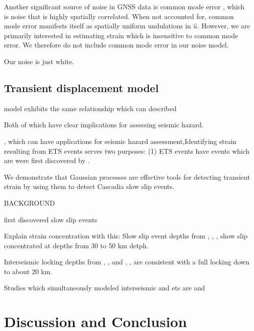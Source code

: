 \documentclass[10pt,a4paper]{article}
\begin{document}
Another significant source of noise in GNSS data is common mode error \citep[e.g.,][]{Wdowinski1997}, which is noise that is highly spatially correlated. When not accounted for, common mode error manifests itself as spatially uniform undulations in $\hat{u}$. However, we are primarily interested in estimating strain which is insensitive to common mode error. We therefore do not include common mode error in our noise model. 

Our noise is just white.           

\subsection{Transient displacement model}

model exhibits the same relationship  which can described  


Both of which have clear implications for assessing seismic hazard.

, which can have applications for seismic hazard assessment,Identifying strain resulting from ETS events serves two purposes: (1) ETS events have  events which are  were first discovered by \citet{Dragert2001}.   


We demonstrate that Gaussian processes are effective tools for detecting transient strain by using them to detect Cascadia slow slip events.  

BACKGROUND

\citet{Dragert2001} first discovered slow slip events

Explain strain concentration with this:
Slow slip event depths from \citet{Dragert2001}, \citet{Wech2009}, \citet{Schmidt2010}, \citet{Bartlow2011} show slip concentrated at depths from 30 to 50 km detph.
 
Interseismic locking depths from \citet{Fluck1997}, \citet{Murray2000}, \citet{McCaffrey2007} and \citet{McCaffrey2013}, \citet{Burgette2009}, \citet{schmalzle2014} are consistent with a full locking down to about 20 km.

Studies which simultaneously modeled interseismic and ets are \citet{Holtkamp2010} and \citet{schmalzle2014}


\section{Discussion and Conclusion}\label{sec:Discussion}
\end{document}
